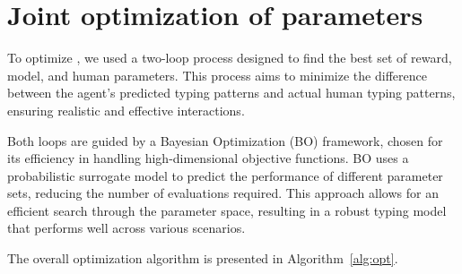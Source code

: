 \section{Joint optimization of parameters}
\label{appendix:optimization}

To optimize \name, we used a two-loop process designed to find the best set of reward, model, and human parameters. This process aims to minimize the difference between the agent's predicted typing patterns and actual human typing patterns, ensuring realistic and effective interactions.

Both loops are guided by a Bayesian Optimization (BO) framework, chosen for its efficiency in handling high-dimensional objective functions. BO uses a probabilistic surrogate model to predict the performance of different parameter sets, reducing the number of evaluations required. This approach allows for an efficient search through the parameter space, resulting in a robust typing model that performs well across various scenarios.

The overall optimization algorithm is presented in Algorithm~\ref{alg:opt}.



